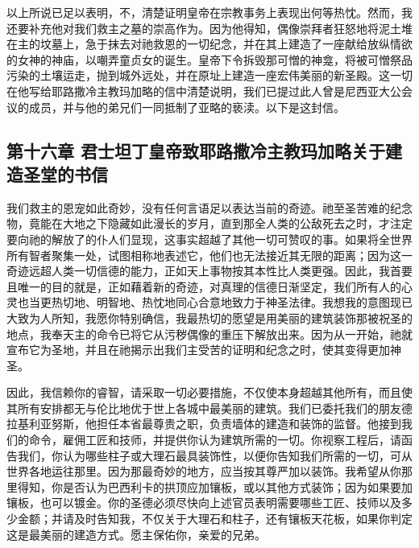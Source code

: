 以上所说已足以表明，不，清楚证明皇帝在宗教事务上表现出何等热忱。然而，我还要补充他对我们救主之墓的崇高作为。因为他得知，偶像崇拜者狂怒地将泥土堆在主的坟墓上，急于抹去对祂救恩的一切纪念，并在其上建造了一座献给放纵情欲的女神的神庙，以嘲弄童贞女的诞生。皇帝下令拆毁那可憎的神龛，将被可憎祭品污染的土壤运走，抛到城外远处，并在原址上建造一座宏伟美丽的新圣殿。这一切在他写给耶路撒冷主教玛加略的信中清楚说明，我们已提过此人曾是尼西亚大公会议的成员，并与他的弟兄们一同抵制了亚略的亵渎。以下是这封信。\par


\subsection{第十六章 君士坦丁皇帝致耶路撒冷主教玛加略关于建造圣堂的书信}

\par

我们救主的恩宠如此奇妙，没有任何言语足以表达当前的奇迹。祂至圣苦难的纪念物，竟能在大地之下隐藏如此漫长的岁月，直到那全人类的公敌死去之时，才注定要向祂的解放了的仆人们显现，这事实超越了其他一切可赞叹的事。如果将全世界所有智者聚集一处，试图相称地表述它，他们也无法接近其无限的距离；因为这一奇迹远超人类一切信德的能力，正如天上事物按其本性比人类更强。因此，我首要且唯一的目的就是，正如藉着新的奇迹，对真理的信德日渐坚定，我们所有人的心灵也当更热切地、明智地、热忱地同心合意地致力于神圣法律。我想我的意图现已大致为人所知，我愿你特别确信，我最热切的愿望是用美丽的建筑装饰那被祝圣的地点，我奉天主的命令已将它从污秽偶像的重压下解放出来。因为从一开始，祂就宣布它为圣地，并且在祂揭示出我们主受苦的证明和纪念之时，使其变得更加神圣。\par

因此，我信赖你的睿智，请采取一切必要措施，不仅使本身超越其他所有，而且使其所有安排都无与伦比地优于世上各城中最美丽的建筑。我们已委托我们的朋友德拉基利亚努斯，他担任本省最尊贵之职，负责墙体的建造和装饰的监督。他接到我们的命令，雇佣工匠和技师，并提供你认为建筑所需的一切。你视察工程后，请函告我们，你认为哪些柱子或大理石最具装饰性，以便你告知我们所需的一切，可从世界各地运往那里。因为那最奇妙的地方，应当按其尊严加以装饰。我希望从你那里得知，你是否认为巴西利卡的拱顶应加镶板，或以其他方式装饰；因为如果要加镶板，也可以镀金。你的圣德必须尽快向上述官员表明需要哪些工匠、技师以及多少金额；并请及时告知我，不仅关于大理石和柱子，还有镶板天花板，如果你判定这是最美丽的建造方式。愿主保佑你，亲爱的兄弟。\par

